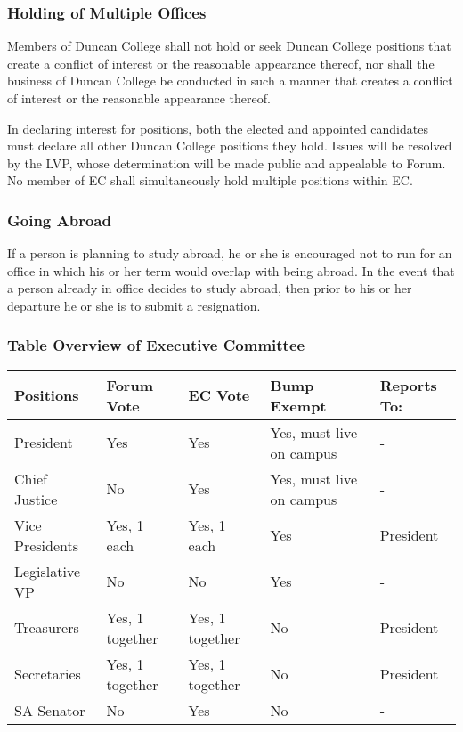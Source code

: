 \documentclass[USletter,12pt]{article}
\begin{document}
\subsubsection{Holding of Multiple Offices}
Members of Duncan College shall not hold or seek Duncan College positions that create a conflict of interest or the reasonable appearance thereof, nor shall the business of Duncan College be conducted in such a manner that creates a conflict of interest or the reasonable appearance thereof.
\begin{enumerate}[(a)]
\Item In declaring interest for positions, both the elected and appointed candidates must declare all other Duncan College positions they hold. Issues will be resolved by the LVP, whose determination will be made public and appealable to Forum. 
\Item No member of EC shall simultaneously hold multiple positions within EC.

\subsubsection{Going Abroad}
If a person is planning to study abroad, he or she is encouraged not to run for an office in which his or her term would overlap with being abroad.  In the event that a person already in office decides to study abroad, then prior to his or her departure he or she is to submit a resignation.

\subsubsection{Table Overview of Executive Committee}
\begin{tabular}{|l| l| l| l| l|}
\hline
	\bfseries{Positions}&\bfseries{Forum Vote}&\bfseries{EC Vote}&\bfseries{Bump Exempt}&\bfseries{Reports To:}\\
\hline\hline
	President&Yes&Yes&Yes, must live on campus&-\\
\hline
	Chief Justice&No&Yes&Yes, must live on campus&-\\
\hline
	Vice Presidents&Yes, 1 each&Yes, 1 each&Yes&President\\
\hline
	Legislative VP&No&No&Yes&-\\
\hline
	Treasurers&Yes, 1 together&Yes, 1 together&No&President\\
\hline
	Secretaries&Yes, 1 together&Yes, 1 together&No&President\\
\hline
	SA Senator&No&Yes&No&-\\
\hline
\end{tabular}


\end{enumerate}
\end{document}
